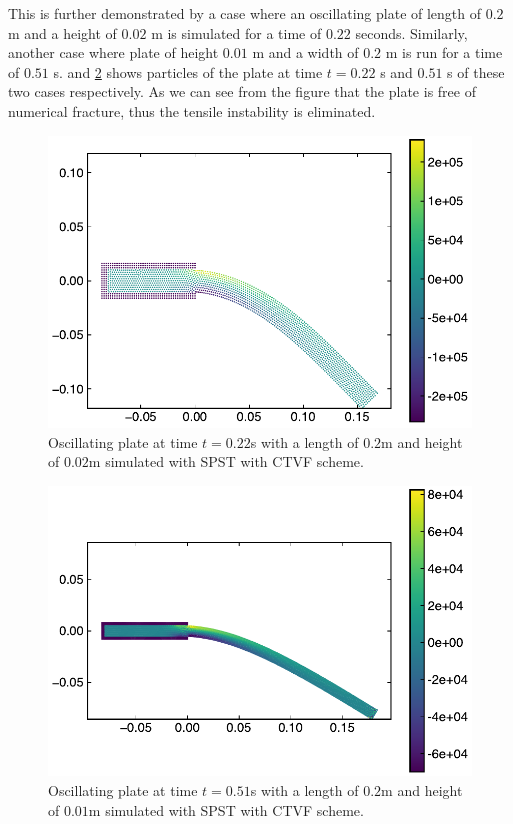 This is further demonstrated by a case where an oscillating plate of length of
$0.2$ m and a height of $0.02$ m is simulated for a time of $0.22$ seconds.
Similarly, another case where plate of height $0.01$ m and a width of $0.2$ m is
run for a time of $0.51$ s.
 and
\cref{fig:oscillating-plate:etvf-sun2019-l-0-2-h-0-01} shows particles of the
plate at time $t=0.22$ s and $0.51$ s of these two cases respectively. As we can
see from the figure that the plate is free of numerical fracture, thus the
tensile instability is eliminated.
%
%
\begin{figure}
  \centering
  \includegraphics[width=0.8\columnwidth]{figures/ctvf/figures/oscillating_plate/etvf_sun2019_l_0_2_h_0_02}
  \caption{Oscillating plate at time $t=0.22$s with a length of $0.2$m and
    height of $0.02$m simulated with SPST with CTVF scheme.}
\label{fig:oscillating-plate:etvf-sun2019-l-0-2-h-0-22}
\end{figure}
%
%
\begin{figure}[!htp]
  \centering
  \includegraphics[width=0.8\columnwidth]{figures/ctvf/figures/oscillating_plate/etvf_sun2019_l_0_2_h_0_01}
  \caption{Oscillating plate at time $t=0.51$s with a length of $0.2$m and
    height of $0.01$m simulated with SPST with CTVF scheme.}
\label{fig:oscillating-plate:etvf-sun2019-l-0-2-h-0-01}
\end{figure}

